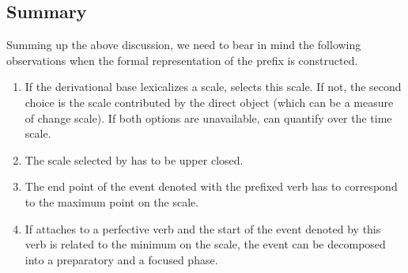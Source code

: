 \subsection{Summary}
Summing up the above discussion, we need to bear in mind the following observations when the formal representation of the prefix  is constructed.
\begin{enumerate}
\item If the derivational base lexicalizes a scale,  selects this scale. If not, the second choice is the scale contributed by the direct object (which can be a measure of change scale). If both options are unavailable,  can quantify over the time scale.
\item The scale selected by  has to be upper closed.
\item The end point of the event denoted with the prefixed verb has to correspond to the maximum point on the scale.
\item If  attaches to a perfective verb and the start of the event denoted by this verb is related to the minimum on the scale, the event can be decomposed into a preparatory and a focused phase.
\end{enumerate}

